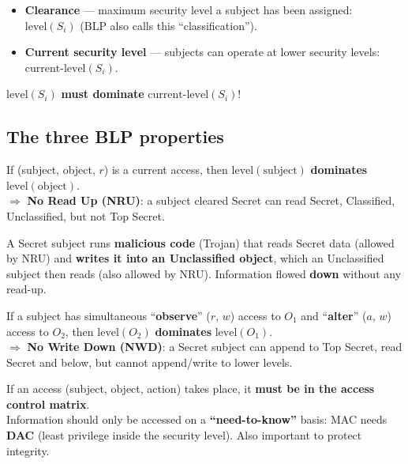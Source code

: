 \begin{defnbox}[title=Clearance of subjects]
\begin{itemize}
  \item \textbf{Clearance} --- maximum security level a subject has been assigned:
        $\text{level}(S_i)$ (BLP also calls this ``classification'').
  \item \textbf{Current security level} --- subjects can operate at lower security
        levels: $\text{current-level}(S_i)$.
\end{itemize}
$\text{level}(S_i)$ \textbf{must dominate} $\text{current-level}(S_i)$!
\end{defnbox}

\subsection{The three BLP properties}

\begin{defnbox}[title=Simple security property (ss-property) --- No Read Up]
If (subject, object, $r$) is a current access, then $\text{level}(\text{subject})$
\textbf{dominates} $\text{level}(\text{object})$. \\
$\Rightarrow$ \textbf{No Read Up (NRU)}: a subject cleared Secret can read Secret,
Classified, Unclassified, but not Top Secret.
\end{defnbox}

\begin{warnbox}[title=Why is the ss-property not sufficient?]
A Secret subject runs \textbf{malicious code} (Trojan) that reads Secret data (allowed
by NRU) and \textbf{writes it into an Unclassified object}, which an Unclassified subject
then reads (also allowed by NRU). Information flowed \textbf{down} without any read-up.
\end{warnbox}

\begin{defnbox}[title=Star property (*-property) --- No Write Down]
If a subject has simultaneous ``\textbf{observe}'' ($r$, $w$) access to $O_1$ and
``\textbf{alter}'' ($a$, $w$) access to $O_2$, then $\text{level}(O_2)$
\textbf{dominates} $\text{level}(O_1)$. \\
$\Rightarrow$ \textbf{No Write Down (NWD)}: a Secret subject can append to Top Secret,
read Secret and below, but cannot append/write to lower levels.
\end{defnbox}

\begin{defnbox}[title=Discretionary property (ds-property)]
If an access (subject, object, action) takes place, it \textbf{must be in the access
control matrix}. \\
Information should only be accessed on a \textbf{``need-to-know''} basis: MAC needs
\textbf{DAC} (least privilege inside the security level). Also important to protect
integrity.
\end{defnbox}


